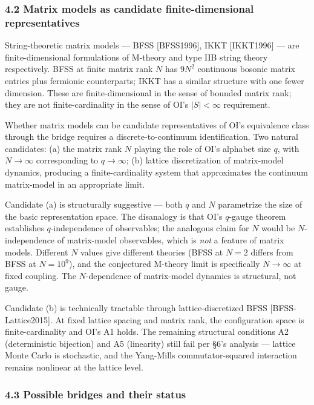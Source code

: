 \documentclass[
]{article}
\begin{document}
\hypertarget{matrix-models-as-candidate-finite-dimensional-representatives}{%
\subsubsection{4.2 Matrix models as candidate finite-dimensional
representatives}\label{matrix-models-as-candidate-finite-dimensional-representatives}}

String-theoretic matrix models --- BFSS {[}BFSS1996{]}, IKKT
{[}IKKT1996{]} --- are finite-dimensional formulations of M-theory and
type IIB string theory respectively. BFSS at finite matrix rank \(N\)
has \(9N^2\) continuous bosonic matrix entries plus fermionic
counterparts; IKKT has a similar structure with one fewer dimension.
These are finite-dimensional in the sense of bounded matrix rank; they
are not finite-cardinality in the sense of OI's \(|S| < \infty\)
requirement.

Whether matrix models can be candidate representatives of OI's
equivalence class through the bridge requires a discrete-to-continuum
identification. Two natural candidates: (a) the matrix rank \(N\)
playing the role of OI's alphabet size \(q\), with \(N \to \infty\)
corresponding to \(q \to \infty\); (b) lattice discretization of
matrix-model dynamics, producing a finite-cardinality system that
approximates the continuum matrix-model in an appropriate limit.

Candidate (a) is structurally suggestive --- both \(q\) and \(N\)
parametrize the size of the basic representation space. The disanalogy
is that OI's \(q\)-gauge theorem establishes \(q\)-independence of
observables; the analogous claim for \(N\) would be \(N\)-independence
of matrix-model observables, which is \emph{not} a feature of matrix
models. Different \(N\) values give different theories (BFSS at \(N=2\)
differs from BFSS at \(N=10^9\)), and the conjectured M-theory limit is
specifically \(N \to \infty\) at fixed coupling. The \(N\)-dependence of
matrix-model dynamics is structural, not gauge.

Candidate (b) is technically tractable through lattice-discretized BFSS
{[}BFSS-Lattice2015{]}. At fixed lattice spacing and matrix rank, the
configuration space is finite-cardinality and OI's A1 holds. The
remaining structural conditions A2 (deterministic bijection) and A5
(linearity) still fail per §6's analysis --- lattice Monte Carlo is
stochastic, and the Yang-Mills commutator-squared interaction remains
nonlinear at the lattice level.

\hypertarget{possible-bridges-and-their-status}{%
\subsubsection{4.3 Possible bridges and their
status}\label{possible-bridges-and-their-status}}
\end{document}
